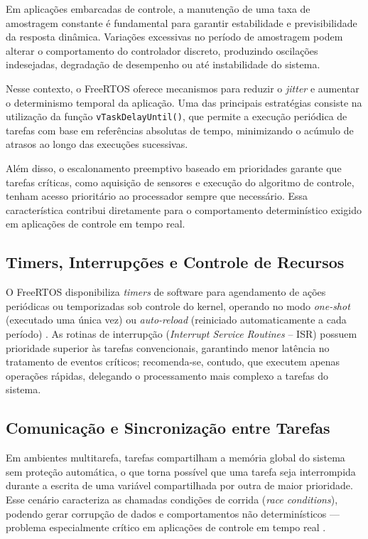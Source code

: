 \documentclass[repeatfields,xlists,xpacks,oneside]{ufrgscca}
\begin{document}
Em aplicações embarcadas de controle, a manutenção de uma taxa de amostragem constante é fundamental para garantir estabilidade e previsibilidade da resposta dinâmica. Variações excessivas no período de amostragem podem alterar o comportamento do controlador discreto, produzindo oscilações indesejadas, degradação de desempenho ou até instabilidade do sistema.

Nesse contexto, o FreeRTOS oferece mecanismos para reduzir o \textit{jitter} e aumentar o determinismo temporal da aplicação. Uma das principais estratégias consiste na utilização da função \texttt{vTaskDelayUntil()}, que permite a execução periódica de tarefas com base em referências absolutas de tempo, minimizando o acúmulo de atrasos ao longo das execuções sucessivas.

Além disso, o escalonamento preemptivo baseado em prioridades garante que tarefas críticas, como aquisição de sensores e execução do algoritmo de controle, tenham acesso prioritário ao processador sempre que necessário. Essa característica contribui diretamente para o comportamento determinístico exigido em aplicações de controle em tempo real.

\subsection{Timers, Interrupções e Controle de Recursos}

O FreeRTOS disponibiliza \textit{timers} de software para agendamento de ações periódicas ou temporizadas sob controle do kernel, operando no modo \textit{one-shot} (executado uma única vez) ou \textit{auto-reload} (reiniciado automaticamente a cada período) \cite{SPOHN:FreeRTOS-Arduino-2019}. As rotinas de interrupção (\textit{Interrupt Service Routines} -- ISR) possuem prioridade superior às tarefas convencionais, garantindo menor latência no tratamento de eventos críticos; recomenda-se, contudo, que executem apenas operações rápidas, delegando o processamento mais complexo a tarefas do sistema.

\subsection{Comunicação e Sincronização entre Tarefas}

Em ambientes multitarefa, tarefas compartilham a memória global do sistema sem proteção automática, o que torna possível que uma tarefa seja interrompida durante a escrita de uma variável compartilhada por outra de maior prioridade. Esse cenário caracteriza as chamadas condições de corrida (\textit{race conditions}), podendo gerar corrupção de dados e comportamentos não determinísticos --- problema especialmente crítico em aplicações de controle em tempo real \cite{denardin2019rtos}.
\end{document}
